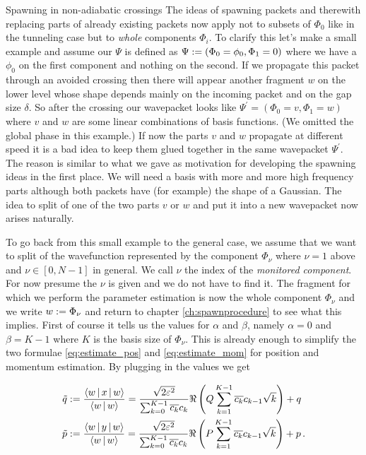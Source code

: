 \begin{chapter}{Spawning in non-adiabatic crossings}
The ideas of spawning packets and therewith replacing parts of already existing
packets now apply not to subsets of $\Phi_0$ like in the tunneling case but
to \emph{whole} components $\Phi_i$. To clarify this let's make a small example
and assume our $\Psi$ is defined as $\Psi := \left(\Phi_0=\phi_0, \Phi_1=0\right)$
where we have a $\phi_0$ on the first component and nothing on the second. If
we propagate this packet through an avoided crossing then there will appear
another fragment $w$ on the lower level whose shape depends mainly on the incoming packet
and on the gap size $\delta$. So after the crossing our wavepacket looks like
$\Psi^\prime = \left(\Phi_0=v, \Phi_1=w\right)$ where $v$ and $w$ are some
linear combinations of basis functions. (We omitted the global phase in this
example.) If now the parts $v$ and $w$ propagate at different speed it is
a bad idea to keep them glued together in the same wavepacket $\Psi^\prime$.
The reason is similar to what we gave as motivation for developing the spawning
ideas in the first place. We will need a basis with more and more high frequency
parts although both packets have (for example) the shape of a Gaussian. The idea
to split of one of the two parts $v$ or $w$ and put it into a new wavepacket now
arises naturally.

To go back from this small example to the general case, we assume that we want
to split of the wavefunction represented by the component $\Phi_\nu$ where
$\nu=1$ above and $\nu \in [0, N-1]$ in general. We call $\nu$ the index of
the \emph{monitored component}. For now presume the $\nu$
is given and we do not have to find it. The fragment for which we perform
the parameter estimation is now the whole component $\Phi_\nu$ and we
write $w := \Phi_\nu$ and return to chapter \ref{ch:spawnprocedure} to
see what this implies. First of course it tells us the values for $\alpha$
and $\beta$, namely $\alpha=0$ and $\beta=K-1$ where $K$ is the basis size
of $\Phi_\nu$. This is already enough to simplify the two formulae
\eqref{eq:estimate_pos} and \eqref{eq:estimate_mom} for position and momentum
estimation. By plugging in the values we get

\begin{align}
  \tilde{q} & := \frac{\Braket{w | x | w}}{\Braket{w|w}}
            = \frac{\sqrt{2 \varepsilon^2}}{\sum_{k=0}^{K-1} \overline{c_k} c_k} \Re \left(Q \sum_{k=1}^{K-1} \overline{c_k} c_{k-1} \sqrt{k} \right) + q
            \label{eq:estimate_pos_na} \\
  \tilde{p} & := \frac{\Braket{w | y | w}}{\Braket{w|w}}
            = \frac{\sqrt{2 \varepsilon^2}}{\sum_{k=0}^{K-1} \overline{c_k} c_k} \Re \left(P \sum_{k=1}^{K-1} \overline{c_k} c_{k-1} \sqrt{k} \right) + p \,.
            \label{eq:estimate_mom_na}
\end{align}


\end{chapter}
